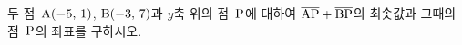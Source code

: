 두 점~$\mathrm{A}(-5,\,1)$, $\mathrm{B}(-3,\,7)$과 $y$축 위의 점~$\mathrm{P}$에 대하여 $\overline{\mathrm{AP}}+\overline{\mathrm{BP}}$의 최솟값과 그때의 점~$\mathrm{P}$의 좌표를 구하시오.
